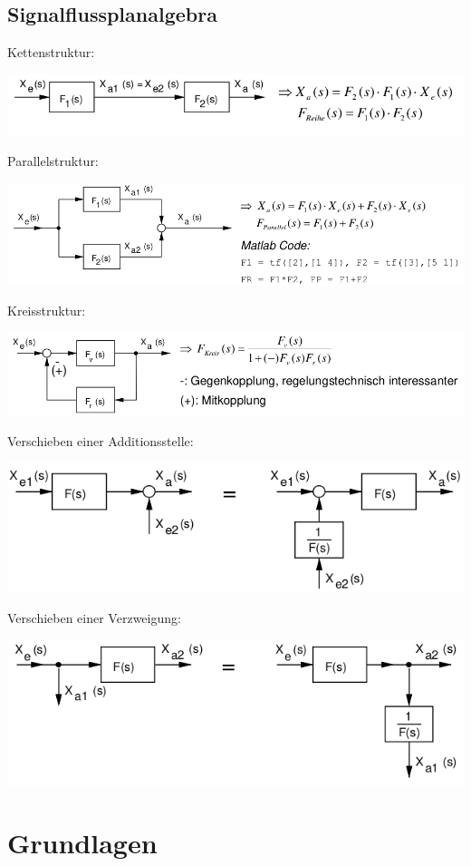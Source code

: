 \documentclass[10pt,a4paper]{article}
\begin{document}
\subsection{Signalflussplanalgebra}
    Kettenstruktur:\\
    \begin{center}
            \includegraphics[width=.45\textwidth]{Figures/Kettenstruktur.png}
    \end{center}
    Parallelstruktur:\\
    \begin{center}
                    \includegraphics[width=.45\textwidth]{Figures/Parallelstruktur.png}
    \end{center}
    Kreisstruktur:\\
    \begin{center}
                    \includegraphics[width=.5\textwidth]{Figures/Kreisstruktur.png}
    \end{center}
    Verschieben einer Additionsstelle:\\
    \begin{center}
                    \includegraphics[width=.45\textwidth]{Figures/Verschiebung einer Additionsstelel.png}
    \end{center}
    Verschieben einer Verzweigung:\\
    \begin{center}
                    \includegraphics[width=.45\textwidth]{Figures/Verschiebung einer Verzweigung.png}
    \end{center}
\section{Grundlagen}
\end{document}
